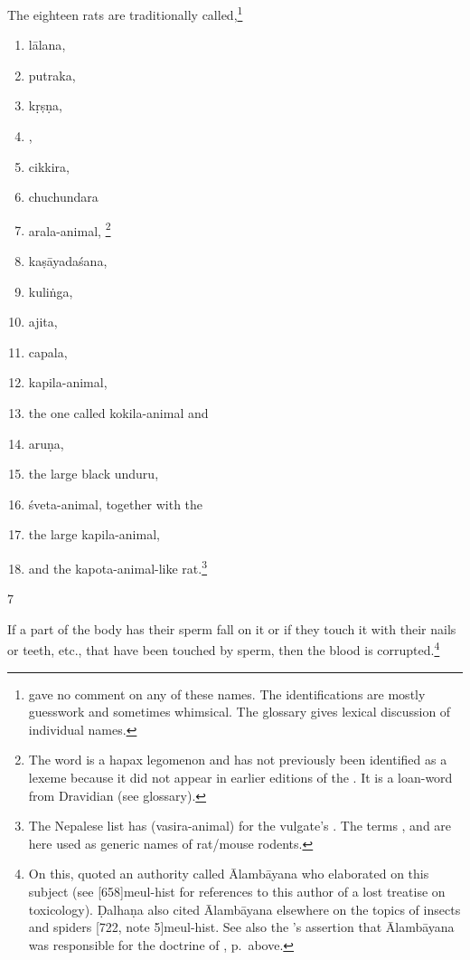 \begin{translation}
    The eighteen rats are traditionally called,\footnote{ 
    gave no 
    comment on any of these names.  The identifications are 
    mostly guesswork and sometimes whimsical.  The glossary gives lexical 
    discussion of individual names.}
\begin{multicols}{2}
    \begin{enumerate}
        \item \Gls{lālana},
        \item \Gls{putraka},
        \item \Gls{kṛṣṇa},
        \item {},
        \item \Gls{cikkira}, %
        \item \Gls{chuchundara} %
        \item \Gls{arala-animal},%
\footnote{The word  is a hapax legomenon and has not 
previously been identified as a lexeme because it did not appear in earlier 
editions of the \SS.  It is a loan-word from Dravidian (see glossary).}        
        \item \Gls{kaṣāyadaśana},
        \item \Gls{kuliṅga},
        \item \Gls{ajita},
        \item \Gls{capala},
        \item \Gls{kapila-animal},
        \item the one called \Gls{kokila-animal} and 
        \item \Gls{aruṇa},
        \item the large black \gls{unduru}, 
        \item \Gls{śveta-animal}, together with the
        \item the large \Gls{kapila-animal},
        \item and the \Gls{kapota-animal}-like rat.\footnote{The Nepalese list has 
         (\Gls{vasira-animal}) for the 
        vulgate's .  The terms ,  and 
         are here used as generic names of rat/mouse rodents.}
\end{enumerate}
    \end{multicols}
\medskip
    
\item[7]

If a part of the body has their sperm fall on it or if they touch it
with their nails or teeth, etc., that have been touched by sperm,
then the blood is corrupted.\footnote{\label{alambayana2}On this,
     quoted an authority called Ālambāyana who
    elaborated on this subject (see [658]{meul-hist} for
    references to this author of a lost treatise on toxicology). Ḍalhaṇa
    also cited Ālambāyana elsewhere on the topics of insects and spiders
    [722, note 5]{meul-hist}. See also the \AS's assertion 
    that Ālambāyana was responsible for the doctrine of , p.\,\pageref{alambayana1} above.
    
}
\end{translation}
